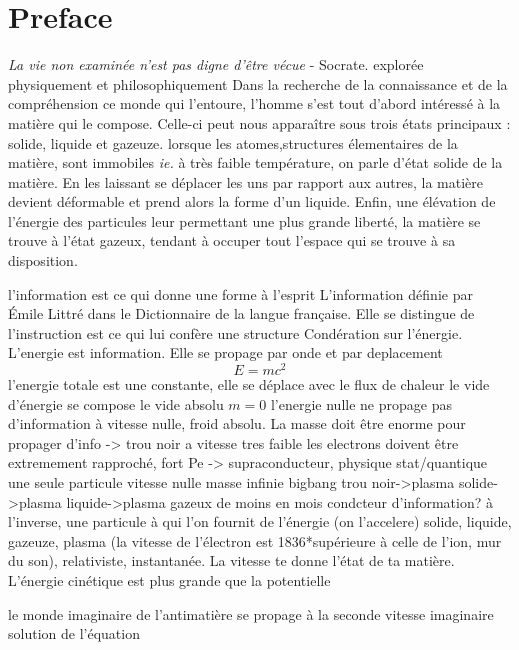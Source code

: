 \thispagestyle{empty}
\cleardoublepage 
\thispagestyle{preface}
\section*{Preface}
			\emph{La vie non examinée n'est pas digne d'être vécue }- Socrate.
			explorée physiquement et philosophiquement
			Dans la recherche de la connaissance et de la compréhension ce monde qui
		l'entoure, l'homme s'est tout d'abord intéressé à la matière qui le compose. Celle-ci
		peut nous apparaître sous trois états principaux : solide, liquide et gazeuze. 
			lorsque les atomes,structures élementaires de la matière, sont immobiles \emph{ie.} à très faible
		température, on parle d'état solide de la matière. En les laissant se déplacer
		les uns par rapport aux autres, la matière devient déformable et prend alors
		la forme d'un liquide. Enfin, une élévation de l'énergie des particules leur
		permettant une plus grande liberté, la matière se trouve à l'état gazeux, 
		tendant à occuper tout l'espace qui se trouve à sa disposition.
	
	 l'information est ce qui donne une forme à l'esprit
L'information définie par Émile Littré dans le Dictionnaire de la langue française. 
Elle se distingue de l'instruction est ce qui lui confère une structure
	Condération sur l'énergie.
	L'energie est information. Elle se propage par onde et par deplacement
	$$E=mc^2$$
	l'energie totale est une constante, elle se déplace avec le flux de chaleur
	le vide d'énergie se compose le vide absolu $m=0$
	l'energie nulle ne propage pas d'information
	à vitesse nulle, froid absolu. La masse doit être enorme pour propager d'info -> trou noir
	a vitesse tres faible les electrons doivent être extremement rapproché, fort Pe -> supraconducteur, physique stat/quantique
	une seule particule vitesse nulle masse infinie 
	bigbang trou noir->plasma solide->plasma liquide->plasma gazeux de moins en mois condcteur d'information?
	à l'inverse, une particule à qui l'on fournit de l'énergie (on l'accelere) 
	solide, liquide, gazeuze, plasma (la vitesse de l'électron est 1836*supérieure à celle de l'ion, mur du son), 
	relativiste, instantanée. 
	La vitesse te donne l'état de ta matière. L'énergie cinétique est plus grande que la potentielle
	
	le monde imaginaire de l'antimatière se propage à la seconde vitesse imaginaire solution de l'équation
	 